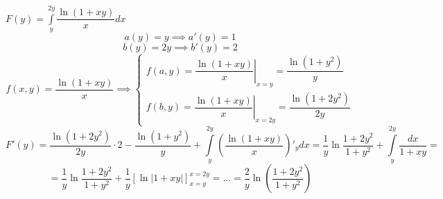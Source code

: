 \documentclass[../../main.tex]{subfiles}
\begin{document}
\begin{example}
    $\displaystyle F(y) = \int\limits_y^{2y} \dfrac{\ln (1 + xy)}{x} dx$
    \[ a(y) = y \implies a'(y) = 1 \]
    \[ b(y) = 2y \implies b'(y) = 2 \]
    \[ f(x, y) = \dfrac{\ln (1 + xy)}{x} \implies
    \begin{cases}
        f(a, y) = \left. \dfrac{\ln (1 + xy)}{x} \right\vert_{x = y}
        = \dfrac{\ln (1 + y^2)}{y} \\
        f(b, y) = \left. \dfrac{\ln (1 + xy)}{x} \right\vert_{x = 2y}
        = \dfrac{\ln (1 + 2y^2)}{2y}
    \end{cases}
    \]
    \[F'(y) = \dfrac{\ln (1 + 2y^2)}{2y} \cdot 2 -\dfrac{\ln (1 + y^2)}{y}
    + \int\limits_y^{2y} \left( \dfrac{\ln (1 + xy)}{x} \right)'_y dx =
    \dfrac{1}{y} \ln \dfrac{1 + 2y^2}{1 + y^2} +
    \int\limits_y^{2y} \dfrac{dx}{1 + xy} = \]
    \[ = \dfrac{1}{y} \ln \dfrac{1 + 2y^2}{1 + y^2}
    +  \dfrac{1}{y} \left[ \ln \left|1 + xy \right| \right]_{x = y}^{x = 2y}
    = \ldots =  \dfrac{2}{y} \ln \left( \dfrac{1 + 2y^2}{1 + y^2} \right) \]
\end{example}
\end{document}
